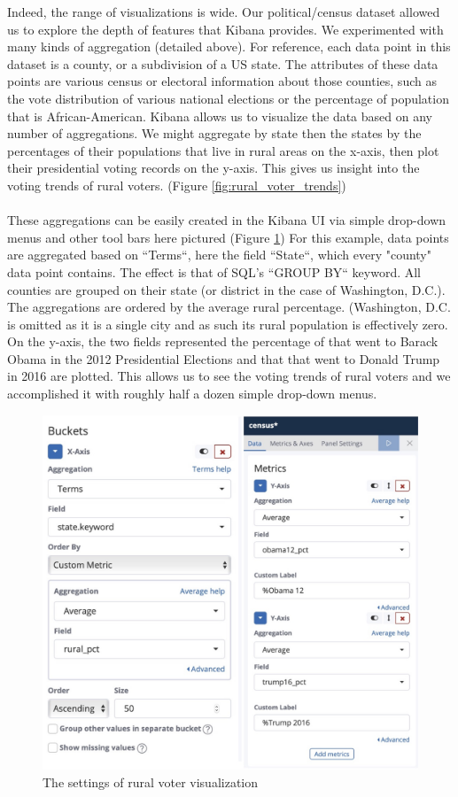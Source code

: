 \documentclass[bibliography=totoc]{article}
\begin{document}
Indeed, the range of visualizations is wide. Our political/census dataset allowed us to explore the depth
of features that Kibana provides. We experimented with many kinds of aggregation (detailed above). For
reference, each data point in this dataset is a county, or a subdivision of a US state. The attributes of
these data points are various census or electoral information about those counties, such as the vote
distribution of various national elections or the percentage of population that is African-American. Kibana
allows us to visualize the data based on any number of aggregations. We might aggregate by state then the
states by the percentages of their populations that live in rural areas on the x-axis, then plot their
presidential voting records on the y-axis. This gives us insight into the voting trends of rural voters.
(Figure \ref{fig:rural_voter_trends})
\\
\\
These aggregations can be easily created in the Kibana UI via simple drop-down menus and other tool bars
here pictured (Figure \ref{fig:rural_voters_settings}) For this example, data points are aggregated based on ``Terms``, here the field ``State``,
which every "county" data point contains. The effect is that of SQL's ``GROUP BY`` keyword. All counties are
grouped on their state (or district in the case of Washington, D.C.). The aggregations are ordered by the
average rural percentage. (Washington, D.C. is omitted as it is a single city and as such its rural
population is effectively zero. On the y-axis, the two fields represented the percentage of that went to
Barack Obama in the 2012 Presidential Elections and that that went to Donald Trump in 2016 are plotted. This
allows us to see the voting trends of rural voters and we accomplished it with roughly half a dozen simple
drop-down menus.
\begin{figure}[!htb]
  \centering
  \includegraphics[height=0.5\textwidth]{rural_voters_settings.png}
 \caption{The settings of rural voter visualization}
  \label{fig:rural_voters_settings}
\end{figure}
\end{document}
